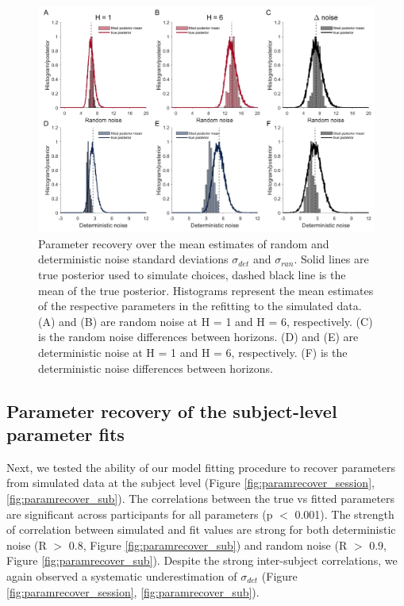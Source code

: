 \documentclass[12pt]{article}
\begin{document}
	\begin{figure}[H]
		\begin{center}
			\includegraphics[width=1\textwidth]{figures/RDBayes_parameterrecovery_hyperprior.jpg}
			\caption{Parameter recovery over the mean estimates of random and deterministic noise standard deviations $\sigma_{det}$ and $\sigma_{ran}$. Solid lines are true posterior used to simulate choices, dashed black line is the mean of the true posterior. Histograms represent the mean estimates of the respective parameters in the refitting to the simulated data. (A) and (B) are random noise at H = 1 and H = 6, respectively. (C) is the random noise differences between horizons. (D) and (E) are deterministic noise at H = 1 and H = 6, respectively. (F) is the deterministic noise differences between horizons.}
			\label{fig:coverage2}
		\end{center}
	\end{figure}

	\newpage
	\subsection{Parameter recovery of the subject-level parameter fits}
	Next, we tested the ability of our model fitting procedure to recover parameters from simulated data at the subject level (Figure \ref{fig:paramrecover_session}, \ref{fig:paramrecover_sub}). The correlations between the true vs fitted parameters are significant across participants for all parameters (p $<$ 0.001). The strength of correlation between simulated and fit values are strong for both deterministic noise (R $>$ 0.8, Figure \ref{fig:paramrecover_sub}) and random noise (R $>$ 0.9, Figure \ref{fig:paramrecover_sub}). Despite the strong inter-subject correlations, we again observed a systematic underestimation of $\sigma_{det}$ (Figure \ref{fig:paramrecover_session}, \ref{fig:paramrecover_sub}).
	
\end{document}
